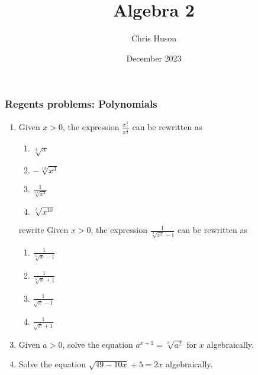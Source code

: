 \documentclass[12pt, twoside]{article}
\title{Algebra 2}
\author{Chris Huson}
\date{December 2023}
\begin{document}
\subsubsection*{Regents problems: Polynomials}
\begin{enumerate}[itemsep=0.5cm]
\item Given $x > 0$, the expression $\displaystyle \frac{x^{\frac{1}{5}}}{x^{\frac{1}{2}}}$ can be rewritten as
\begin{enumerate}
    \item $\sqrt[3]{x}$
    \item $-\sqrt[10]{x^3}$
    \item $\displaystyle \frac{1}{\sqrt[10]{x^3}}$
    \item $\sqrt[3]{x^{10}}$
\end{enumerate}

\item [rewrite] Given $x > 0$, the expression $\frac{1}{\sqrt[3]{x^2} - 1}$ can be rewritten as
\begin{enumerate}
    \item $\frac{1}{\sqrt[3]{x} - 1}$
    \item $\frac{1}{\sqrt[3]{x} + 1}$
    \item $\frac{1}{\sqrt{x} - 1}$
    \item $\frac{1}{\sqrt{x} + 1}$
\end{enumerate}

\item Given $a > 0$, solve the equation $a^{x+1} = \sqrt[3]{a^2}$ for $x$ algebraically.

\item Solve the equation $\sqrt{49-10x} +5 = 2x$ algebraically.


\end{enumerate}
\end{document}
